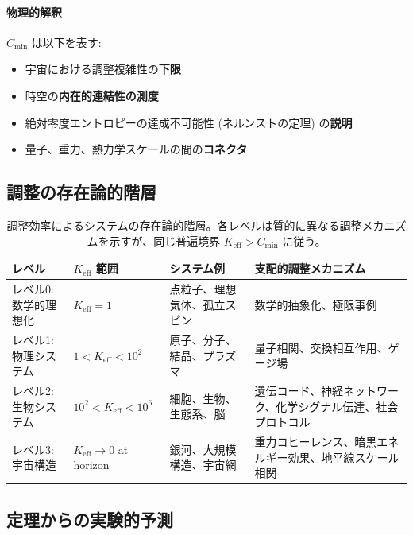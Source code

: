\documentclass[11pt,a4paper]{article}
\begin{document}
	\paragraph{物理的解釈}
	$C_{\min}$ は以下を表す:
	\begin{itemize}
		\item 宇宙における調整複雑性の\textbf{下限}
		\item 時空の\textbf{内在的連結性の測度}
		\item 絶対零度エントロピーの達成不可能性 (ネルンストの定理) の\textbf{説明}
		\item 量子、重力、熱力学スケールの間の\textbf{コネクタ}
	\end{itemize}
	
	\subsection{調整の存在論的階層}
	
	\begin{table}[htbp]
		\centering
		\small

			\begin{tabular}{|p{}|p{}|p{}|p{}|}
				\hline
				\textbf{レベル} & \textbf{$K_{\mathrm{eff}}$ 範囲} & \textbf{システム例} & \textbf{支配的調整メカニズム} \\
				\hline
				レベル0: 数学的理想化 & $K_{\mathrm{eff}} = 1$ & 点粒子、理想気体、孤立スピン & 数学的抽象化、極限事例 \\
				\hline
				レベル1: 物理システム & $1 < K_{\mathrm{eff}} < 10^2$ & 原子、分子、結晶、プラズマ & 量子相関、交換相互作用、ゲージ場 \\
				\hline
				レベル2: 生物システム & $10^2 < K_{\mathrm{eff}} < 10^6$ & 細胞、生物、生態系、脳 & 遺伝コード、神経ネットワーク、化学シグナル伝達、社会プロトコル \\
				\hline
				レベル3: 宇宙構造 & $K_{\mathrm{eff}} \to 0$ at horizon & 銀河、大規模構造、宇宙網 & 重力コヒーレンス、暗黒エネルギー効果、地平線スケール相関 \\
				\hline
			\end{tabular}

		\caption{調整効率によるシステムの存在論的階層。各レベルは質的に異なる調整メカニズムを示すが、同じ普遍境界 $K_{\mathrm{eff}} > C_{\min}$ に従う。}
		\label{tab:ontology-hierarchy}
	\end{table}
	
	\subsection{定理からの実験的予測}
	
\end{document}
